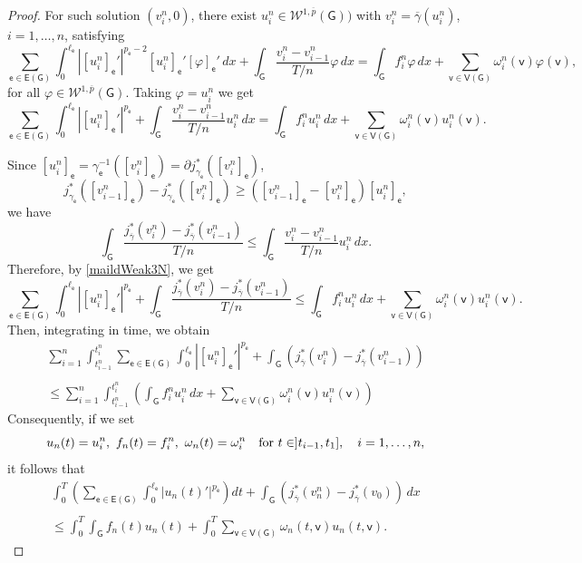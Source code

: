 \documentclass[reqno,12pt]{amsart}
\def\e{\mathsf{e}} 	%
\def\v{\mathsf{v}}	%
\newcommand{\G}{\mathsf{G}}	%
\newcommand{\V}{\mathsf{V}}	%
\newcommand{\E}{\mathsf{E}}	%
\numberwithin{equation}{section} %
\begin{document}
\begin{proof}
For such solution $(v_i^n,0)$, there exist $u_i^n  \in \mathcal{W}^{1,\overline{p}}(\G))$ with $v_i^n  = \overline{\gamma} (u_i^n)$, $i= 1, \ldots, n$, satisfying  
\begin{equation}\label{maildWeak3} 
\sum_{\e \in\E(\G)}\int_{0}^{\ell_\e}|[u_i^n]_\e'|^{p_\e-2}[u_i^n]_\e' [\varphi]_\e' \, d x  + \int_\G  \frac{v_i^n - v_{i-1}^n}{T/n} \varphi\, d x  = \int_{\G} f_i^n \varphi\,dx+ \sum_{\v\in \V(\G)}\omega_i^n(\v)\varphi(\v), 
\end{equation}
 for all   $\varphi \in \mathcal{W}^{1,\overline{p}}(\G)$.
Taking $\varphi = u_i^n$  
we get 
\begin{equation}\label{maildWeak3N} 
\sum_{\e \in\E(\G)}\int_{0}^{\ell_\e}|[u_i^n]_\e'|^{p_\e}   + \int_\G  \frac{v_i^n - v_{i-1}^n}{T/n} u_i^n\,  d x  = \int_{\G} f_i^n u_i^n\, dx + \sum_{\v\in \V(\G)}\omega_i^n(\v) u_i^n(\v). 
\end{equation}

Since  $[u_i^n]_\e = \gamma_\e^{-1}([v_i^n]_\e) = \partial j^*_{\gamma_\e}([v_i^n]_\e)$,
$$j^*_{\gamma_\e}([v_{i-1}^n]_\e) - j^*_{\gamma_\e}([v_{i}^n]_\e) \geq ([v_{i-1}^n]_\e -[v_{i}^n]_\e) [u_i^n]_\e,$$
we have
$$\int_\G  \frac{j^*_{\overline{\gamma}}(v_{i}^n) - j^*_{\overline{\gamma}}(v_{i-1}^n)}{T/n}    \leq  \int_\G  \frac{v_i^n - v_{i-1}^n}{T/n} u_i^n\, d x.$$
Therefore,   by \eqref{maildWeak3N}, we get
$$\sum_{\e \in\E(\G)}\int_{0}^{\ell_\e}|[u_i^n]_\e'|^{p_\e}   +  \int_\G  \frac{j^*_{\overline{\gamma}}(v_{i}^n) - j^*_{\overline{\gamma}}(v_{i-1}^n)}{T/n}     \leq  \int_{\G} f_i^n u_i^n\,dx+ \sum_{\v\in \V(\G)}\omega_i^n(\v) u_i^n(\v). $$
 Then, integrating in time, we obtain
 \begin{equation}\label{maildWeak4} \begin{array}{ll}
\displaystyle\sum_{i=1}^n \displaystyle \int_{t_{i-1}^n}^{t_i^n} \sum_{\e \in\E(\G)}\int_{0}^{\ell_\e}|[u_i^n]_\e'|^{p_\e}    + \int_\G  (j^*_{\overline{\gamma}}(v_{i}^n) - j^*_{\overline{\gamma}}(v_{i-1}^n))    \\
\\ \displaystyle
\leq  \sum_{i=1}^n \displaystyle \int_{t_{i-1}^n}^{t_i^n} \left( \int_{\G} f_i^n u_i^n \,dx+ \sum_{\v\in \V(\G)}\omega_i^n(\v) u_i^n(\v) \right)\end{array}
 \end{equation}
 Consequently, if we set
$$ u_n(t) = u_i^n, \ f_n(t) =f_i^n, \  \omega_n(t) = \omega_i^n \quad \hbox{for} \ t \in ]t_{i-1}, t_1], \quad i= 1, \ldots, n,$$
it follows that  
   \begin{equation}\label{maildWeak4NN}\begin{array}{ll}
\displaystyle \int_0^T \left(\sum_{\e \in\E(\G)}\int_{0}^{\ell_\e}| u_n(t)'|^{p_\e}   \right)dt  + \int_\G  (j^*_{\overline{\gamma}}(v_{n}^n) - j^*_{\overline{\gamma}}(v_{0}))  \, d x  \\ \\ \leq \displaystyle  \int_0^T  \int_{\G} f_n (t) u_n(t) + \int_0^T \sum_{\v\in \V(\G)}  \omega_n(t,\v) u_n(t,\v). \end{array}
 \end{equation}
 


\end{proof}
\end{document}
